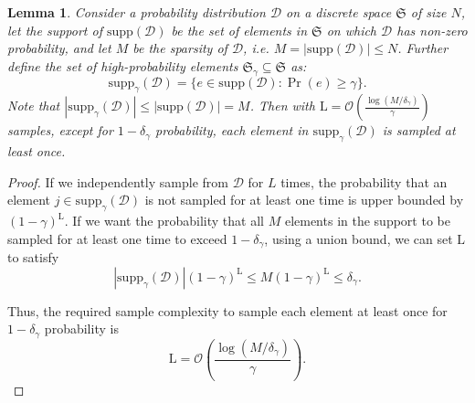 \documentclass[twocolumn,superscriptaddress,aps,showpacs,amsmath,amstex,amssymb,citeautoscript,floatfix,pra,preprintnumbers]{revtex4-2}
\newtheorem{lemma}[theorem]{Lemma}
\theoremstyle{plain}
\theoremstyle{plain}
\theoremstyle{plain}
\theoremstyle{plain}
\theoremstyle{plain}
\theoremstyle{plain}
\begin{document}
\begin{appendix}
\begin{lemma}
\label{lem:sample_complexity_from_dist_with_gap}
    Consider a probability distribution $\mathcal{D}$ on a discrete space $\mathfrak{S}$ of size $N$, let the support of $\text{supp}(\mathcal{D})$ be the set of elements in $\mathfrak{S}$ on which $\mathcal{D}$ has non-zero probability, and let $M$ be the \emph{sparsity} of $\mathcal{D}$, i.e. $M = |\text{supp}(\mathcal{D})|\leq N$. Further define the set of high-probability elements $\mathfrak{S}_{\gamma}\subseteq \mathfrak{S}$ as:
\begin{equation}
    \text{supp}_\gamma(\mathcal{D}) = \{e\in\text{supp}(\mathcal{D}):\Pr(e)\geq\gamma\}.
\end{equation}
Note that $|\text{supp}_\gamma(\mathcal{D})|\leq |\text{supp}(\mathcal{D})| = M$. Then with $\mathrm{L} = \mathcal{O}\left(\frac{\log(M/\delta_{\gamma})}{\gamma}\right)$ samples, except for $1-\delta_{\gamma}$ probability, each element in $\text{supp}_\gamma(\mathcal{D})$ is sampled at least once.
\end{lemma}
\begin{proof}
If we independently sample from $\mathcal{D}$ for $L$ times, the probability that an element $j\in \text{supp}_\gamma(\mathcal{D})$ is not sampled for at least one time is upper bounded by $(1-\gamma)^{\mathrm{L}}$. If we want the probability that all $M$ elements in the support to be sampled for at least one time to exceed $1-\delta_{\gamma}$, using a union bound, we can set $\mathrm{L}$ to satisfy
\begin{equation}
    |\text{supp}_\gamma(\mathcal{D})|(1-\gamma)^{\mathrm{L}}\leq M(1-\gamma)^{\mathrm{L}}\leq \delta_{\gamma}.
\end{equation}

Thus, the required sample complexity to sample each element at least once for $1-\delta_{\gamma}$ probability is
\begin{equation}
\label{eq:sample_complexity_for_support_of_classical}
    \mathrm{L} = \mathcal{O}\left(\frac{\log(M/\delta_{\gamma})}{\gamma}\right).
\end{equation}
\end{proof}


\end{appendix}
\end{document}
